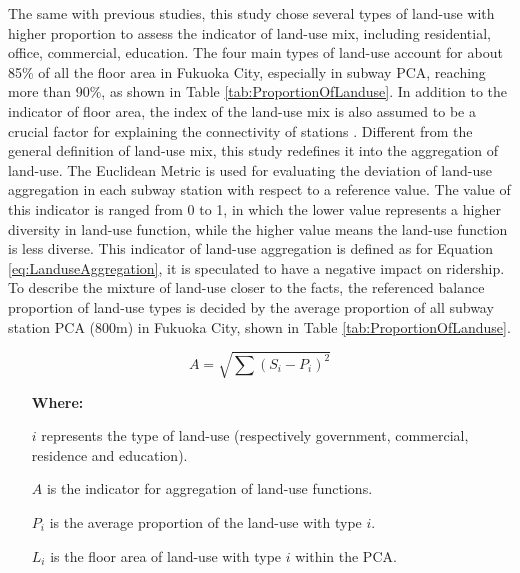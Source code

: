 \documentclass[utf8]{article}
\begin{document}
%
The same with previous studies, this study chose several types of land-use with higher proportion to assess the indicator of land-use mix, including residential, office, commercial, education. The four main types of land-use account for about 85\% of all the floor area in Fukuoka City, especially in subway PCA, reaching more than 90\%, as shown in Table \ref{tab:ProportionOfLanduse}. In addition to the indicator of floor area, the index of the land-use mix is also assumed to be a crucial factor for explaining the connectivity of stations \cite{Badoe2000,Cervero2004,Frank2004}. Different from the general definition of land-use mix, this study redefines it into the aggregation of land-use. The Euclidean Metric is used for evaluating the deviation of land-use aggregation in each subway station with respect to a reference value. The value of this indicator is ranged from 0 to 1, in which the lower value represents a higher diversity in land-use function, while the higher value means the land-use function is less diverse. This indicator of land-use aggregation is defined as for Equation \ref{eq:LanduseAggregation}, it is speculated to have a negative impact on ridership. To describe the mixture of land-use closer to the facts, the referenced balance proportion of land-use types is decided by the average proportion of all subway station PCA (800m) in Fukuoka City, shown in Table \ref{tab:ProportionOfLanduse}.

\begin{equation}
	A=\sqrt{\sum (S_i-P_i)^2}
	\label{eq:LanduseAggregation}
\end{equation}

\begin{enumerate}
	\item[\textbf{Where:}]
	\item[$i$] represents the type of land-use (respectively government, commercial, residence and education).
	\item[$A$] is the indicator for aggregation of land-use functions.
	\item[$P_i$] is the average proportion of the land-use with type $i$.
	\item[$L_i$] is the floor area of land-use with type $i$ within the PCA.
\end{enumerate}
\end{document}

